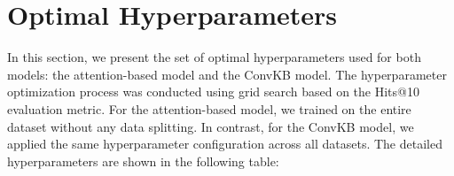 \clearpage
\setcounter{page}{1}
\maketitlesupplementary




\section{Optimal Hyperparameters}
\label{appendix:Appendix1}

In this section, we present the set of optimal hyperparameters used for both models: the attention-based model and the ConvKB model. The hyperparameter optimization process was conducted using grid search based on the Hits@10 evaluation metric. For the attention-based model, we trained on the entire dataset without any data splitting. In contrast, for the ConvKB model, we applied the same hyperparameter configuration across all datasets. The detailed hyperparameters are shown in the following table:


